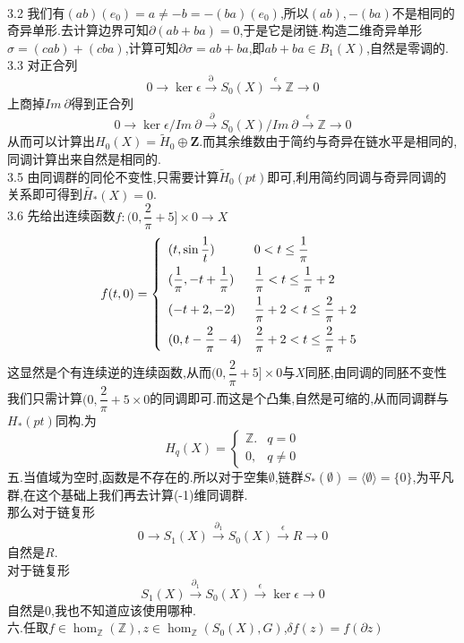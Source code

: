 \documentclass[a4paper]{ctexart}
\newcommand{\es}[5]{#1\xrightarrow{#2}#3\xrightarrow{#4}#5\xrightarrow{}0}
\newcommand{\ess}[5]{0\xrightarrow{}#1\xrightarrow{#2}#3\xrightarrow{#4}#5\xrightarrow{}0}
\begin{document}
\pagestyle{plain}
\noindent
{}
\\
3.2 我们有$(ab)(e_0)=a\neq -b=-(ba)(e_0)$,所以$(ab),-(ba)$不是相同的奇异单形.去计算边界可知$\partial(ab+ba)=0$,于是它是闭链.构造二维奇异单形$\sigma=(cab)+(cba)$,计算可知$\partial\sigma=ab+ba$,即$ab+ba
\in B_1(X)$,自然是零调的.\\
3.3 对正合列
\[\ess{\ker \epsilon}{\partial}{S_0(X)}{\epsilon}{\mathbb{Z}}\]
上商掉$Im~\partial$得到正合列
\[\ess{\ker \epsilon /Im~\partial}{~\partial}{S_0(X)/Im~\partial}{\epsilon}{\mathbb{Z}}\]
从而可以计算出$H_0(X)=\tilde{H}_0\oplus \mathbf{Z}$.而其余维数由于简约与奇异在链水平是相同的,同调计算出来自然是相同的.\\
3.5 由同调群的同伦不变性,只需要计算$\tilde{H}_0(pt)$即可,利用简约同调与奇异同调的关系即可得到$\tilde{H_*}(X)=0$.\\
3.6 先给出连续函数$f:(0,\dfrac{2}{\pi}+5]\times 0\to X$\\
\[f(t,0)=\left\lbrace  \begin{array}{ll}
(t,\sin\dfrac{1}{t}) & 0<t\leq \dfrac{1}{\pi}\vspace{4pt}\\
(\dfrac{1}{\pi},-t+\dfrac{1}{\pi}) & \dfrac{1}{\pi}<t\leq \dfrac{1}{\pi}+2\vspace{4pt}\\
(-t+2,-2) & \dfrac{1}{\pi}+2<t\leq \dfrac{2}{\pi}+2\vspace{4pt}\\
(0,t-\dfrac{2}{\pi}-4) & \dfrac{2}{\pi}+2<t\leq \dfrac{2}{\pi}+5 \\
\end{array}\right. \]
这显然是个有连续逆的连续函数,从而$(0,\dfrac{2}{\pi}+5]\times 0$与$X$同胚,由同调的同胚不变性我们只需计算$(0,\dfrac{2}{\pi}+5\times 0$的同调即可.而这是个凸集,自然是可缩的,从而同调群与$H_*(pt)$同构.为
\[H_q(X)=\left\lbrace \begin{array}{ll}
\mathbb{Z}. & q=0\\
0, & q\neq 0
\end{array}\right. \]
五.当值域为空时,函数是不存在的.所以对于空集$\emptyset$,链群$S_*(\emptyset)=\langle \emptyset \rangle=\{0\}$,为平凡群,在这个基础上我们再去计算(-1)维同调群.\\
那么对于链复形
\[\ess{S_1(X)}{\partial_1}{S_0(X)}{\epsilon}{R}\]
自然是$R$.\\
对于链复形
\[\es{S_1(X)}{\partial_1}{S_0(X)}{\epsilon}{\ker \epsilon}\]
自然是${0}$,我也不知道应该使用哪种.\\
六.任取$f\in \hom_{\mathbb{Z}}(\mathbb{Z}),z\in \hom_{\mathbb{Z}}(S_0(X),G)$,$\delta f(z)=f(\partial z)$
\end{document}
